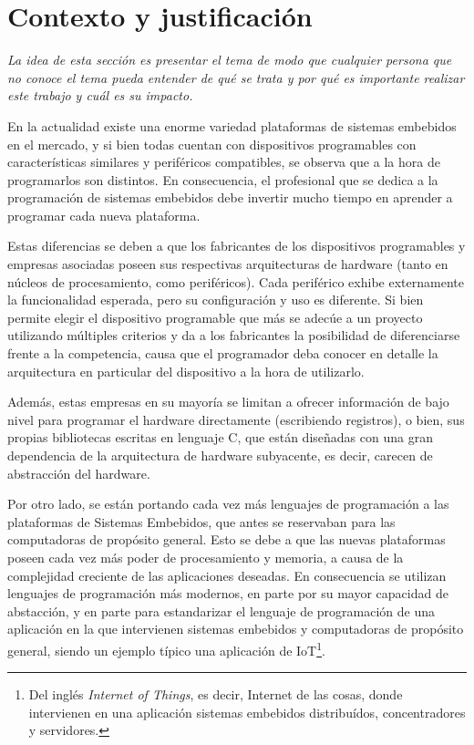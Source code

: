 \section{Contexto y justificación}
\label{sec:contextoYJustificacion}

\emph{La idea de esta sección es presentar el tema de modo que cualquier persona que no conoce el tema pueda entender de qué se trata y por qué es importante realizar este trabajo y cuál es su impacto.}

En la actualidad existe una enorme variedad plataformas de sistemas embebidos en el mercado, y si bien todas cuentan con dispositivos programables con características similares y periféricos compatibles, se observa que a la hora de programarlos son distintos. En consecuencia, el profesional que se dedica a la programación de sistemas embebidos debe invertir mucho tiempo en aprender a programar cada nueva plataforma.

Estas diferencias se deben a que los fabricantes de los dispositivos programables y empresas asociadas poseen sus respectivas arquitecturas de hardware (tanto en núcleos de procesamiento, como periféricos). Cada periférico exhibe externamente la funcionalidad esperada, pero su configuración y uso es diferente. Si bien permite elegir el dispositivo programable que más se adecúe a un proyecto utilizando múltiples criterios y da a los fabricantes la posibilidad de diferenciarse frente a la competencia, causa que el programador deba conocer en detalle la arquitectura en particular del dispositivo a la hora de utilizarlo.

Además, estas empresas en su mayoría se limitan a ofrecer información de bajo nivel para programar el hardware directamente (escribiendo registros), o bien, sus propias bibliotecas escritas en lenguaje C, que están diseñadas con una gran dependencia de la arquitectura de hardware subyacente, es decir, carecen de abstracción del hardware.

Por otro lado, se están portando cada vez más lenguajes de programación a las plataformas de Sistemas Embebidos, que antes se reservaban para las computadoras de propósito general. Esto se debe a que las nuevas plataformas poseen cada vez más poder de procesamiento y memoria, a causa de la complejidad creciente de las aplicaciones deseadas. En consecuencia se utilizan lenguajes de programación más modernos, en parte por su mayor capacidad de abstacción, y en parte para estandarizar el lenguaje de programación de una aplicación en la que intervienen sistemas embebidos y computadoras de propósito general, siendo un ejemplo típico una aplicación de IoT\footnote{Del inglés \emph{Internet of Things}, es decir, Internet de las cosas, donde intervienen en una aplicación sistemas embebidos distribuídos, concentradores y servidores.}.

